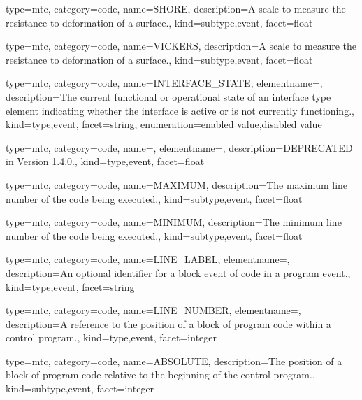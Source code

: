 {
  type=mtc,
  category=code,
  name={SHORE},
  description={A scale to measure the resistance to deformation of a surface.},
  kind={subtype,event},
  facet={\gls{float}}
}


{
  type=mtc,
  category=code,
  name={VICKERS},
  description={A scale to measure the resistance to deformation of a surface.},
  kind={subtype,event},
  facet={\gls{float}}
}


{
  type=mtc,
  category=code,
  name={INTERFACE\_STATE},
  elementname=,
  description={The current functional or operational state of an \gls{interface} type element indicating whether the interface is active or is not currently functioning.},
  kind={type,event},
  facet={\gls{string}},
  enumeration={\gls{enabled value},\gls{disabled value}}
}


{
  type=mtc,
  category=code,
  name=,
  elementname=,
  description={DEPRECATED in Version 1.4.0.},
  kind={type,event},
  facet={\gls{float}}
}


{
  type=mtc,
  category=code,
  name={MAXIMUM},
  description={The maximum line number of the code being executed.},
  kind={subtype,event},
  facet={\gls{float}}
}


{
  type=mtc,
  category=code,
  name={MINIMUM},
  description={The minimum line number of the code being executed.},
  kind={subtype,event},
  facet={\gls{float}}
}


{
  type=mtc,
  category=code,
  name={LINE\_LABEL},
  elementname=,
  description={An optional identifier for a \gls{block event} of code in a \gls{program event}.},
  kind={type,event},
  facet={\gls{string}}
}


{
  type=mtc,
  category=code,
  name={LINE\_NUMBER},
  elementname=,
  description={A reference to the position of a block of program code within a control program.},
  kind={type,event},
  facet={\gls{integer}}
}


{
  type=mtc,
  category=code,
  name={ABSOLUTE},
  description={The position of a block of program code relative to the beginning of the control program.},
  kind={subtype,event},
  facet={\gls{integer}}
}


